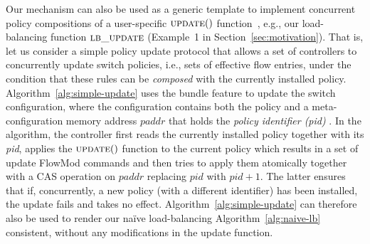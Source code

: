 \documentclass[conference]{sigcomm-alternate}
\newcommand{\paddr}{\textit{paddr}\xspace}
\newcommand{\pid}{\textit{pid}\xspace}
\newcommand{\ufunc}{update} %
\newcommand{\liron}[1]{\textit{\textcolor{mygreen}{[liron]: #1}}} %
\newcommand{\petr}[1]{\textit{\textcolor{blue}{[petr]: #1}}} %
\begin{document}





Our mechanism can also be used as a generic template to
implement concurrent policy compositions of a user-specific
$\textsc{\ufunc}()$ function~\cite{stn}, e.g., our load-balancing
function $\textsc{lb\_update}$ (Example~1 in Section~\ref{sec:motivation}).
That is, let us consider a simple policy update protocol that
allows a set of  controllers to concurrently update switch policies, i.e., sets of
effective flow entries, under the
condition that these rules can be \emph{composed} with the currently installed
policy.
Algorithm~\ref{alg:simple-update} uses the bundle feature to update
the switch configuration, where the configuration contains both the
policy and a meta-configuration memory address $\paddr$ that holds the \emph{policy identifier (pid)} .
In the algorithm, the controller first reads the currently installed
policy together with its {\pid},  applies the
$\textsc{\ufunc}()$ function to the current policy which results in a
set of update FlowMod commands and then tries to apply them
atomically together with a CAS operation on $\paddr$ replacing $\pid$
with $\pid+1$.
The latter ensures that if, concurrently, a new policy (with a different identifier) has been installed, the update
fails and takes no effect.
Algorithm~\ref{alg:simple-update} can therefore also be used
to render our na\"ive load-balancing Algorithm~\ref{alg:naive-lb}
consistent, without any modifications in the update function.



\end{document}

